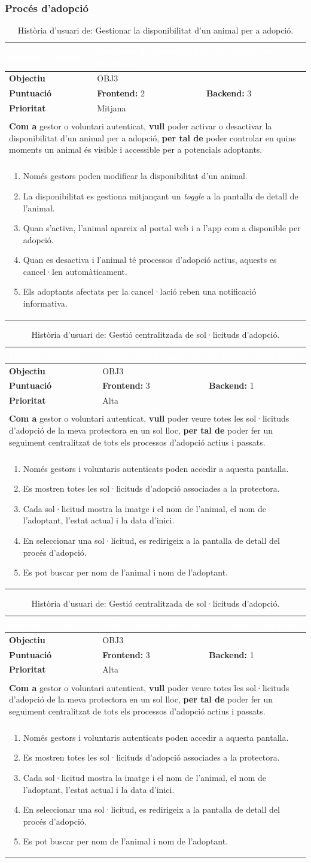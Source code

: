 \documentclass[11pt,a4paper]{report}
\newcommand{\HU}[9]{%
\begin{table}[H]\centering\footnotesize\renewcommand{\arraystretch}{1.1}%
\setlength{\extrarowheight}{0pt}%
\begin{tabular}{|l|p{4.8cm}|p{4.8cm}|}\hline
\rowcolor{oceanblue}\textcolor{white}{\textbf{Història d'Usuari}} & \multicolumn{2}{l|}{\textcolor{white}{#2}} \\\hline
\textbf{Objectiu} & \multicolumn{2}{l|}{#1} \\\hline
\rowcolor{gray!10}\textbf{Puntuació} & \textbf{Frontend: } #3 & \textbf{Backend: } #4 \\\hline
\textbf{Prioritat} & \multicolumn{2}{l|}{#5} \\\hline
\rowcolor{oceanblue}\multicolumn{3}{|l|}{\textcolor{white}{\textbf{Descripció}}} \\\hline
\multicolumn{3}{|p{12.5cm}|}{\textbf{Com a} #6, \textbf{vull} #7, \textbf{per tal de} #8.} \\\hline
\rowcolor{oceanblue}\multicolumn{3}{|l|}{\textcolor{white}{\textbf{Criteris d'Acceptació}}} \\\hline
\multicolumn{3}{|p{12.5cm}|}{\begin{enumerate}[leftmargin=0.4cm,topsep=0pt,parsep=0pt,itemsep=1pt,partopsep=0pt,after=\vspace{-3pt}] #9 \end{enumerate}} \\\hline
\end{tabular}\caption[HU: #2]{Història d'usuari de: #2.}\label{tab:hu_#1}\end{table}%
}
\begin{document}
\subsubsection{Procés d'adopció}
    \HU{OBJ3}
    {Gestionar la disponibilitat d'un animal per a adopció}
    {2}
    {3}
    {Mitjana}
    {gestor o voluntari autenticat}
    {poder activar o desactivar la disponibilitat d'un animal per a adopció}
    {poder controlar en quins moments un animal és visible i accessible per a potencials adoptants}
    {
        \item Només gestors poden modificar la disponibilitat d'un animal.
        \item La disponibilitat es gestiona mitjançant un \textit{toggle} a la pantalla de detall de l'animal.
        \item Quan s'activa, l'animal apareix al portal web i a l'app com a disponible per adopció.
        \item Quan es desactiva i l'animal té processos d'adopció actius, aquests es cancel·len automàticament.
        \item Els adoptants afectats per la cancel·lació reben una notificació informativa.
    }
    \HU{OBJ3}
    {Gestió centralitzada de sol·licituds d'adopció}
    {3}
    {1}
    {Alta}
    {gestor o voluntari autenticat}
    {poder veure totes les sol·licituds d'adopció de la meva protectora en un sol lloc}
    {poder fer un seguiment centralitzat de tots els processos d'adopció actius i passats}
    {
        \item Només gestors i voluntaris autenticats poden accedir a aquesta pantalla.
        \item Es mostren totes les sol·licituds d'adopció associades a la protectora.
        \item Cada sol·licitud mostra la imatge i el nom de l'animal, el nom de l'adoptant, l'estat actual i la data d'inici.
        \item En seleccionar una sol·licitud, es redirigeix a la pantalla de detall del procés d'adopció.
        \item Es pot buscar per nom de l'animal i nom de l'adoptant.
    }
    \HU{OBJ3}
    {Gestió centralitzada de sol·licituds d'adopció}
    {3}
    {1}
    {Alta}
    {gestor o voluntari autenticat}
    {poder veure totes les sol·licituds d'adopció de la meva protectora en un sol lloc}
    {poder fer un seguiment centralitzat de tots els processos d'adopció actius i passats}
    {
        \item Només gestors i voluntaris autenticats poden accedir a aquesta pantalla.
        \item Es mostren totes les sol·licituds d'adopció associades a la protectora.
        \item Cada sol·licitud mostra la imatge i el nom de l'animal, el nom de l'adoptant, l'estat actual i la data d'inici.
        \item En seleccionar una sol·licitud, es redirigeix a la pantalla de detall del procés d'adopció.
        \item Es pot buscar per nom de l'animal i nom de l'adoptant.
    }
\end{document}
